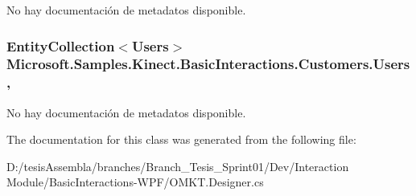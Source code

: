 No hay documentación de metadatos disponible. 

\hypertarget{class_microsoft_1_1_samples_1_1_kinect_1_1_basic_interactions_1_1_customers_a26a76e825cd3639ef6080515aa5a4589}{
\subsubsection[{Users}]{\setlength{\rightskip}{0pt plus 5cm}Entity\-Collection$<${\bf Users}$>$ Microsoft.\-Samples.\-Kinect.\-Basic\-Interactions.\-Customers.\-Users\hspace{0.3cm}{\ttfamily [get]}, {\ttfamily [set]}}}\label{class_microsoft_1_1_samples_1_1_kinect_1_1_basic_interactions_1_1_customers_a26a76e825cd3639ef6080515aa5a4589}


No hay documentación de metadatos disponible. 



The documentation for this class was generated from the following file\-:\begin{DoxyCompactItemize}
\item 
D\-:/tesis\-Assembla/branches/\-Branch\-\_\-\-Tesis\-\_\-\-Sprint01/\-Dev/\-Interaction Module/\-Basic\-Interactions-\/\-W\-P\-F/O\-M\-K\-T.\-Designer.\-cs\end{DoxyCompactItemize}
